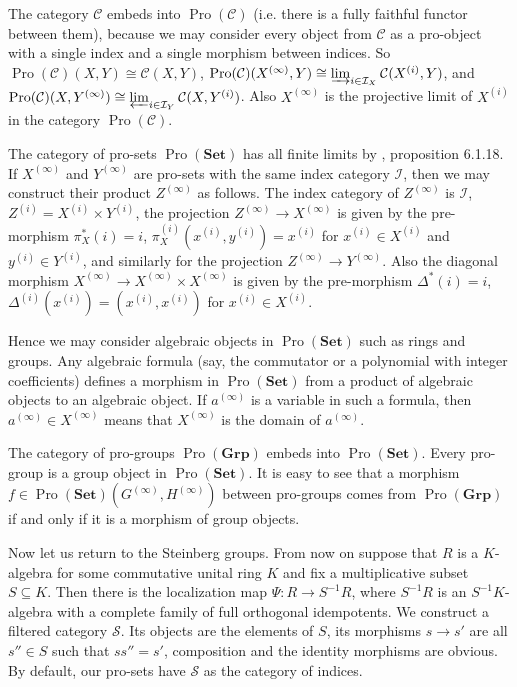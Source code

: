 \documentclass{article}
\newcommand{\rar}{\rightarrow}
\newcommand{\Set}{\mathbf{Set}}
\newcommand{\Group}{\mathbf{Grp}}
\DeclareMathOperator{\Pro}{Pro}
\begin{document}
The category \(\mathcal C\) embeds into \(\Pro(\mathcal C)\) (i.e. there is a fully faithful functor between them), because we may consider every object from \(\mathcal C\) as a pro-object with a single index and a single morphism between indices. So \(\Pro(\mathcal C)(X, Y) \cong \mathcal C(X, Y)\), \(\Pro(\mathcal C)(X^{(\infty)}, Y) \cong \varinjlim_{i \in \mathcal I_X} \mathcal C(X^{(i)}, Y)\), and \(\Pro(\mathcal C)(X, Y^{(\infty)}) \cong \varprojlim_{i \in \mathcal I_Y} \mathcal C(X, Y^{(i)})\). Also \(X^{(\infty)}\) is the projective limit of \(X^{(i)}\) in the category \(\Pro(\mathcal C)\).

The category of pro-sets \(\Pro(\Set)\) has all finite limits by \cite{CategoryTextbook}, proposition 6.1.18. If \(X^{(\infty)}\) and \(Y^{(\infty)}\) are pro-sets with the same index category \(\mathcal I\), then we may construct their product \(Z^{(\infty)}\) as follows. The index category of \(Z^{(\infty)}\) is \(\mathcal I\), \(Z^{(i)} = X^{(i)} \times Y^{(i)}\), the projection \(Z^{(\infty)} \rar X^{(\infty)}\) is given by the pre-morphism \(\pi_X^*(i) = i\), \(\pi_X^{(i)}(x^{(i)}, y^{(i)}) = x^{(i)}\) for \(x^{(i)} \in X^{(i)}\) and \(y^{(i)} \in Y^{(i)}\), and similarly for the projection \(Z^{(\infty)} \rar Y^{(\infty)}\). Also the diagonal morphism \(X^{(\infty)} \rar X^{(\infty)} \times X^{(\infty)}\) is given by the pre-morphism \(\Delta^*(i) = i\), \(\Delta^{(i)}(x^{(i)}) = (x^{(i)}, x^{(i)})\) for \(x^{(i)} \in X^{(i)}\).

Hence we may consider algebraic objects in \(\Pro(\Set)\) such as rings and groups. Any algebraic formula (say, the commutator or a polynomial with integer coefficients) defines a morphism in \(\Pro(\Set)\) from a product of algebraic objects to an algebraic object. If \(a^{(\infty)}\) is a variable in such a formula, then \(a^{(\infty)} \in X^{(\infty)}\) means that \(X^{(\infty)}\) is the domain of \(a^{(\infty)}\).

The category of pro-groups \(\Pro(\Group)\) embeds into \(\Pro(\Set)\). Every pro-group is a group object in \(\Pro(\Set)\). It is easy to see that a morphism \(f \in \Pro(\Set)(G^{(\infty)}, H^{(\infty)})\) between pro-groups comes from \(\Pro(\Group)\) if and only if it is a morphism of group objects.

Now let us return to the Steinberg groups. From now on suppose that \(R\) is a \(K\)-algebra for some commutative unital ring \(K\) and fix a multiplicative subset \(S \subseteq K\). Then there is the localization map \(\Psi \colon R \rar S^{-1} R\), where \(S^{-1} R\) is an \(S^{-1} K\)-algebra with a complete family of full orthogonal idempotents. We construct a filtered category \(\mathcal S\). Its objects are the elements of \(S\), its morphisms \(s \rar s'\) are all \(s'' \in S\) such that \(ss'' = s'\), composition and the identity morphisms are obvious. By default, our pro-sets have \(\mathcal S\) as the category of indices.
\end{document}
